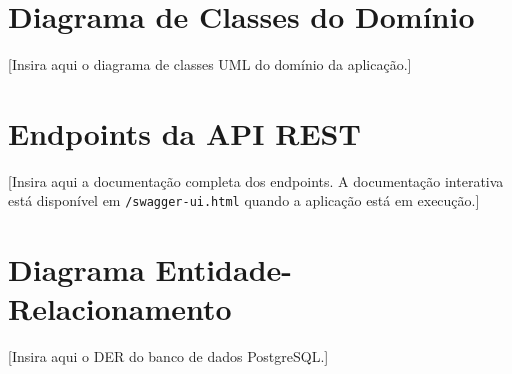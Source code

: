 \documentclass[
  12pt,             %
  openright,        %
  twoside,          %
  a4paper,          %
  english,          %
  brazilian         %
]{abntex2}
\begin{document}

\begin{apendicesenv}
  \partapendices
  \chapter{Diagrama de Classes do Domínio}
  \label{apendice:diagrama-classes}

  [Insira aqui o diagrama de classes UML do domínio da aplicação.]

  \chapter{Endpoints da API REST}
  \label{apendice:endpoints}

  [Insira aqui a documentação completa dos endpoints. A documentação interativa
  está disponível em \texttt{/swagger-ui.html} quando a aplicação está em execução.]

  \chapter{Diagrama Entidade-Relacionamento}
  \label{apendice:der}

  [Insira aqui o DER do banco de dados PostgreSQL.]

\end{apendicesenv}

\end{document}

